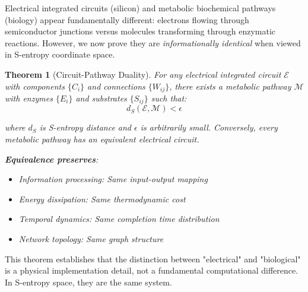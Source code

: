 \documentclass[11pt,a4paper]{article}
\newtheorem{theorem}{Theorem}[section]
\begin{document}
Electrical integrated circuits (silicon) and metabolic biochemical pathways (biology) appear fundamentally different: electrons flowing through semiconductor junctions versus molecules transforming through enzymatic reactions. However, we now prove they are \textit{informationally identical} when viewed in S-entropy coordinate space\cite{sachikonye2024grand}.

\begin{theorem}[Circuit-Pathway Duality]
\label{thm:circuit_pathway_duality}
For any electrical integrated circuit $\mathcal{E}$ with components $\{C_i\}$ and connections $\{W_{ij}\}$, there exists a metabolic pathway $\mathcal{M}$ with enzymes $\{E_i\}$ and substrates $\{S_{ij}\}$ such that:
\begin{equation}
d_S(\mathcal{E}, \mathcal{M}) < \epsilon
\end{equation}

where $d_S$ is S-entropy distance and $\epsilon$ is arbitrarily small. Conversely, every metabolic pathway has an equivalent electrical circuit.

\textbf{Equivalence preserves}:
\begin{itemize}
\item Information processing: Same input-output mapping
\item Energy dissipation: Same thermodynamic cost
\item Temporal dynamics: Same completion time distribution
\item Network topology: Same graph structure
\end{itemize}
\end{theorem}

This theorem establishes that the distinction between "electrical" and "biological" is a physical implementation detail, not a fundamental computational difference. In S-entropy space, they are the same system.
\end{document}
